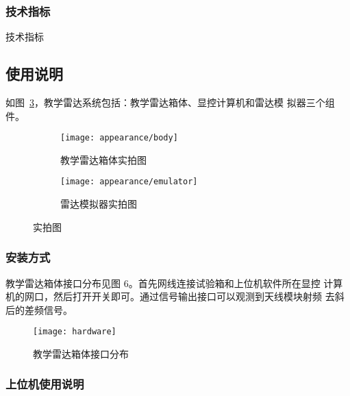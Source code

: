 \documentclass[../main]{subfiles}
\begin{document}
\subsubsection{技术指标}%
\label{ssub:technology}

\begin{table}[htbp]
  \centering
  \caption{技术指标}%
  \label{tab:technology}
\end{table}

\subsection{使用说明}%
\label{sub:usage}

如图~\ref{fig:appearance}，教学雷达系统包括：教学雷达箱体、显控计算机和雷达模
拟器三个组件。

\begin{figure}[htbp]
  \centering
  \begin{subfigure}[htbp]{0.45\linewidth}
    \centering
    \texttt{[image: appearance/body]}
    \caption{教学雷达箱体实拍图}%
    \label{fig:appearance/body}
  \end{subfigure}
  \quad
  \begin{subfigure}[htbp]{0.45\linewidth}
    \centering
    \texttt{[image: appearance/emulator]}
    \caption{雷达模拟器实拍图}%
    \label{fig:appearance/emulator}
  \end{subfigure}
  \caption{实拍图}%
  \label{fig:appearance}
\end{figure}

\subsubsection{安装方式}%
\label{ssub:install}

教学雷达箱体接口分布见图 6。首先网线连接试验箱和上位机软件所在显控
计算机的网口，然后打开开关即可。通过信号输出接口可以观测到天线模块射频
去斜后的差频信号。

\begin{figure}[htbp]
  \centering
  \texttt{[image: hardware]}
  \caption{教学雷达箱体接口分布}%
  \label{fig:hardware}
\end{figure}

\subsubsection{上位机使用说明}%
\label{ssub:monitor}
\end{document}
